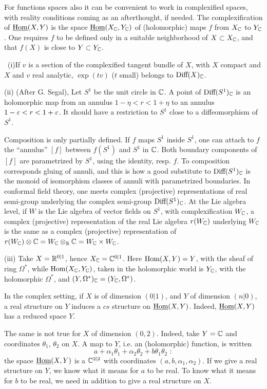 For functions spaces also it can be convenient to work in
complexified spaces, with reality conditions coming as an
afterthought, if needed.
The complexification of $\underline{\text{\rm Hom}}(X,Y)$ is the space
$\underline{\text{\rm Hom}}({X_{{\Bbb C}}},{Y_{{\Bbb C}}})$ of (holomorphic) maps $f$ from ${X_{{\Bbb C}}}$ to
${Y_{{\Bbb C}}}$.
One requires $f$ to be defined only in a suitable
neighborhood of $X\subset{X_{{\Bbb C}}}$, and that $f(X)$ is close
to $Y\subset{Y_{{\Bbb C}}}$.

 \ 
(i)\enspace If $v$ is a section of the complexified
tangent bundle of $X$, with $X$ compact and $X$ and $v$
real analytic, $\exp(tv)$ ($t$ small) belongs to
$\text{\rm Diff}(X)_{{\Bbb C}}$.

\smallskip\noindent
(ii)\enspace
(After G. Segal),\enspace
 Let $S^1$ be the unit circle in ${\Bbb C}$.
A point of $\text{\rm Diff}(S^1)_{{\Bbb C}}$ is an holomorphic map from
an annulus $1-\eta<r<1+\eta$ to an annulus
$1-{\varepsilon}<r<1+{\varepsilon}$.
It should have a restriction to $S^1$ close to a
diffeomorphism of $S^1$.

Composition is only partially defined.
If $f$ maps $S^1$ inside $S^1$, one can attach to $f$ the
``annulus'' $[f]$ between $f(S^1)$ and $S^1$ in ${\Bbb C}$.
Both boundary components of $[f]$ are parametrized by
$S^1$, using the identity, resp. $f$.
To composition corresponds gluing of annuli, and this is
how a good substitute to $\text{\rm Diff}(S^1)_{{\Bbb C}}$ is the monoid
of isomorphism classes of annuli with parametrized
boundaries.
In conformal field theory, one meets complex
(projective) representations of real semi-group underlying 
the complex semi-group $\text{\rm Diff}(S^1)_{{\Bbb C}}$.
At the Lie algebra level, if $W$ is the Lie algebra of
vector fields on $S^1$, with complexification ${W_{{\Bbb C}}}$, a
complex (projective) representation of the real Lie
algebra $r({W_{{\Bbb C}}})$ underlying ${W_{{\Bbb C}}}$ is the same as a
complex (projective) representation of
$r({W_{{\Bbb C}}})\otimes{\Bbb C}={W_{{\Bbb C}}}\otimes_{{\Bbb R}}{\Bbb C}={W_{{\Bbb C}}}\times{W_{{\Bbb C}}}$.


\smallskip\noindent
(iii)\enspace
Take $X={\Bbb R}^{0\vert 1}$, hence ${X_{{\Bbb C}}}={\Bbb C}^{0\vert 1}$.
Here $\text{\rm Hom}(X,Y)=Y$, with the sheaf of ring $\Omega^*$,
while $\text{\rm Hom}({X_{{\Bbb C}}},{Y_{{\Bbb C}}})$, taken in the holomorphic world is
${Y_{{\Bbb C}}}$, with the holomorphic $\Omega^*$, and $(Y,\Omega^*)_{{\Bbb C}}=
({Y_{{\Bbb C}}},\Omega^*)$.
\endexample

In the complex setting, if $X$ is of dimension $(0\vert
1)$, and $Y$ of dimension $(n\vert 0)$, a real structure
on $Y$ induces a $cs$ structure on $\underline{\text{\rm Hom}}(X,Y)$.
Indeed, $\underline{\text{\rm Hom}}(X,Y)$ has a reduced space $Y$.

The same is not true for $X$ of dimension $(0,2)$.
Indeed, take $Y={\Bbb C}$ and coordinates $\theta_1$, 
$\theta_2$ on $X$.
A map to $Y$, i.e. an (holomorphic) function, is written
$$
a+\alpha_1\theta_1+\alpha_2\theta_2+b\theta_1\theta_2\,\,:
$$
the space $\underline{\text{\rm Hom}}(X,Y)$ is a ${\Bbb C}^{2\vert 2}$ with
coordinates $(a,b,\alpha_1,\alpha_2)$.
If we give a real structure on $Y$, we know what it means
for $a$ to be real.
To know what it means for $b$ to be real, we need in
addition to give a real structure on $X$.

